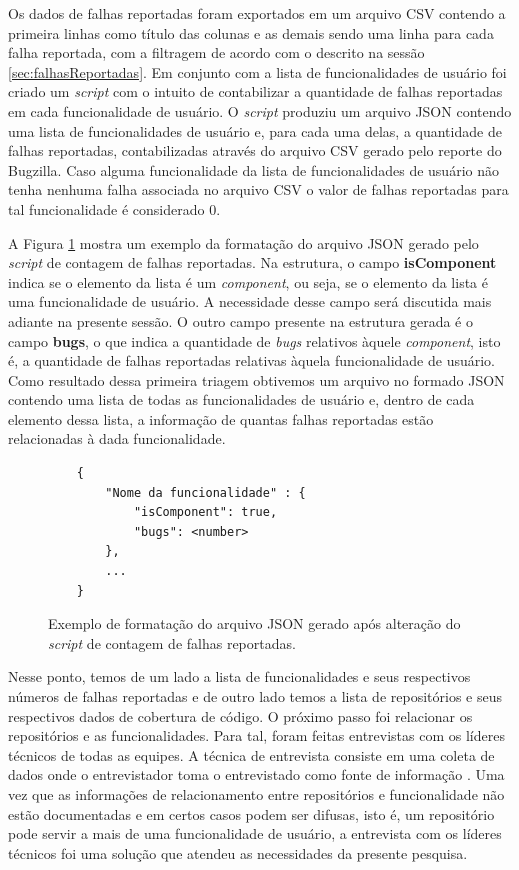 \documentclass[11.5pt]{article}
\begin{document}
Os dados de falhas reportadas foram exportados em um arquivo CSV contendo a primeira linhas como
título das colunas e as demais sendo uma linha para cada falha reportada, com a filtragem de acordo
com o descrito na sessão \ref{sec:falhasReportadas}.
Em conjunto com a lista de funcionalidades de usuário foi criado um \textit{script} com o intuito
de contabilizar a quantidade de falhas reportadas em cada funcionalidade de usuário.
O \textit{script} produziu um arquivo JSON
contendo uma lista de funcionalidades de usuário e, para cada uma delas, a quantidade de falhas
reportadas, contabilizadas através do arquivo CSV gerado pelo reporte do Bugzilla. Caso alguma
funcionalidade da lista de funcionalidades de usuário não tenha nenhuma falha associada no arquivo
CSV o valor de falhas reportadas para tal funcionalidade é considerado 0.

A Figura \ref{fig:formatoJsonBugs} mostra um exemplo da formatação do arquivo JSON gerado pelo
\textit{script} de contagem de falhas reportadas.
Na estrutura, o campo \textbf{isComponent} indica se o elemento da lista é um \textit{component},
ou seja, se o elemento da lista é uma funcionalidade de usuário.
A necessidade desse campo será discutida mais adiante na presente sessão.
O outro campo presente na estrutura gerada é o campo \textbf{bugs}, o que indica a quantidade de
\textit{bugs} relativos àquele \textit{component}, isto é, a quantidade de falhas reportadas
relativas àquela funcionalidade de usuário.
Como resultado dessa primeira triagem obtivemos um arquivo no formado JSON contendo uma lista de
todas as funcionalidades de usuário e, dentro de cada elemento dessa lista, a informação de quantas
falhas reportadas estão relacionadas à dada funcionalidade.

\begin{figure}[ht]
\label{fig:formatoJsonBugs}
\small
\begin{verbatim}
    {
        "Nome da funcionalidade" : {
            "isComponent": true,
            "bugs": <number>
        },
        ...
    }
\end{verbatim}
\caption{Exemplo de formatação do arquivo JSON gerado após alteração do \textit{script} de contagem
de falhas reportadas.}
\end{figure}

Nesse ponto, temos de um lado a lista de funcionalidades e seus respectivos números de falhas
reportadas e de outro lado temos a lista de repositórios e seus respectivos dados de cobertura
de código.
O próximo passo foi relacionar os repositórios e as funcionalidades.
Para tal, foram feitas entrevistas com os líderes técnicos de todas as equipes.
A técnica de entrevista consiste em uma coleta de dados onde o entrevistador toma o entrevistado
como fonte de informação \cite{metodosPesquisaSocial}.
Uma vez que as informações de relacionamento entre repositórios e funcionalidade não estão
documentadas e em certos casos podem ser difusas, isto é, um repositório pode servir a mais de uma
funcionalidade de usuário, a entrevista com os líderes técnicos foi uma solução que atendeu as
necessidades da presente pesquisa.
\end{document}
